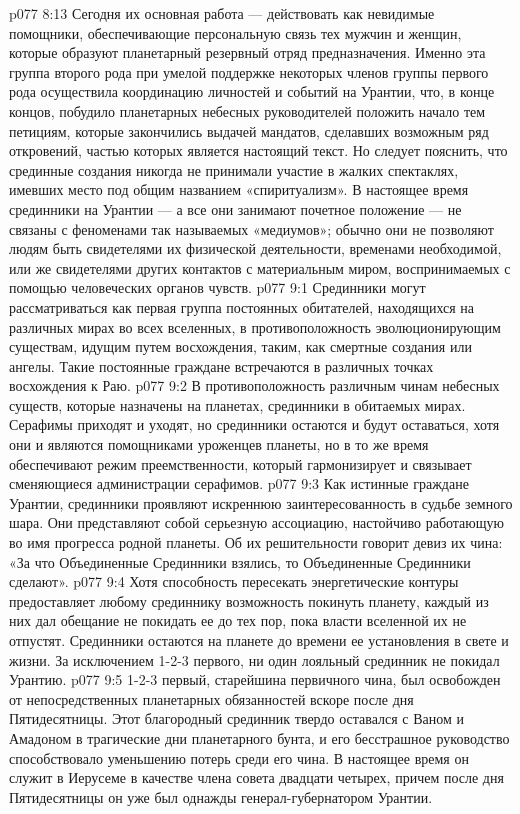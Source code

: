 \vs p077 8:13 Сегодня их основная работа --- действовать как невидимые помощники, обеспечивающие персональную связь тех мужчин и женщин, которые образуют планетарный резервный отряд предназначения. Именно эта группа второго рода при умелой поддержке некоторых членов группы первого рода осуществила координацию личностей и событий на Урантии, что, в конце концов, побудило планетарных небесных руководителей положить начало тем петициям, которые закончились выдачей мандатов, сделавших возможным ряд откровений, частью которых является настоящий текст. Но следует пояснить, что срединные создания никогда не принимали участие в жалких спектаклях, имевших место под общим названием «спиритуализм». В настоящее время срединники на Урантии --- а все они занимают почетное положение --- не связаны с феноменами так называемых «медиумов»; обычно они не позволяют людям быть свидетелями их физической деятельности, временами необходимой, или же свидетелями других контактов с материальным миром, воспринимаемых с помощью человеческих органов чувств.
\vs p077 9:1 Срединники могут рассматриваться как первая группа постоянных обитателей, находящихся на различных мирах во всех вселенных, в противоположность эволюционирующим существам, идущим путем восхождения, таким, как смертные создания или ангелы. Такие постоянные граждане встречаются в различных точках восхождения к Раю.
\vs p077 9:2 В противоположность различным чинам небесных существ, которые назначены  на планетах, срединники  в обитаемых мирах. Серафимы приходят и уходят, но срединники остаются и будут оставаться, хотя они и являются помощниками уроженцев планеты, но в то же время обеспечивают режим преемственности, который гармонизирует и связывает сменяющиеся администрации серафимов.
\vs p077 9:3 Как истинные граждане Урантии, срединники проявляют искреннюю заинтересованность в судьбе земного шара. Они представляют собой серьезную ассоциацию, настойчиво работающую во имя прогресса родной планеты. Об их решительности говорит девиз их чина: «За что Объединенные Срединники взялись, то Объединенные Срединники сделают».
\vs p077 9:4 Хотя способность пересекать энергетические контуры предоставляет любому срединнику возможность покинуть планету, каждый из них дал обещание не покидать ее до тех пор, пока власти вселенной их не отпустят. Срединники остаются на планете до времени ее установления в свете и жизни. За исключением 1\hyp{}2\hyp{}3 первого, ни один лояльный срединник не покидал Урантию.
\vs p077 9:5 1\hyp{}2\hyp{}3 первый, старейшина первичного чина, был освобожден от непосредственных планетарных обязанностей вскоре после дня Пятидесятницы. Этот благородный срединник твердо оставался с Ваном и Амадоном в трагические дни планетарного бунта, и его бесстрашное руководство способствовало уменьшению потерь среди его чина. В настоящее время он служит в Иерусеме в качестве члена совета двадцати четырех, причем после дня Пятидесятницы он уже был однажды генерал\hyp{}губернатором Урантии.
